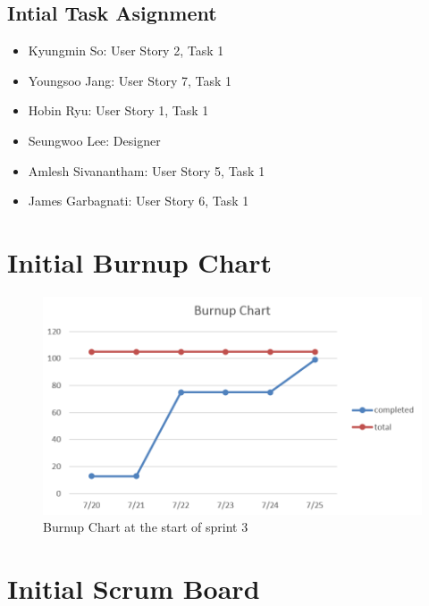 \documentclass[10pt]{article}
\newcommand{\fancysecX}[2] {{\color{primary}\section*{#1} \label{sec:#2}}}
\newcommand{\fancysubX}[2] {{\color{primary}\subsection*{#1} \label{sec:#2}}}
\begin{document}
    \fancysubX{Intial Task Asignment}{intialtask}
        \begin{itemize}
            \item Kyungmin So: User Story 2, Task 1
            \item Youngsoo Jang: User Story 7, Task 1
            \item Hobin Ryu: User Story 1, Task 1
            \item Seungwoo Lee: Designer
            \item Amlesh Sivanantham: User Story 5, Task 1 
            \item James Garbagnati: User Story 6, Task 1
        \end{itemize}

\fancysecX{Initial Burnup Chart}{burnupchart}

    \begin{figure}[!ht]
  	
  	\centering
    		\includegraphics[width=1\textwidth]{Burnupchart3}
    \caption{Burnup Chart at the start of sprint 3}
    \end{figure}

\vspace{9cm}
\fancysecX{Initial Scrum Board}{scrumboard}
\end{document}
